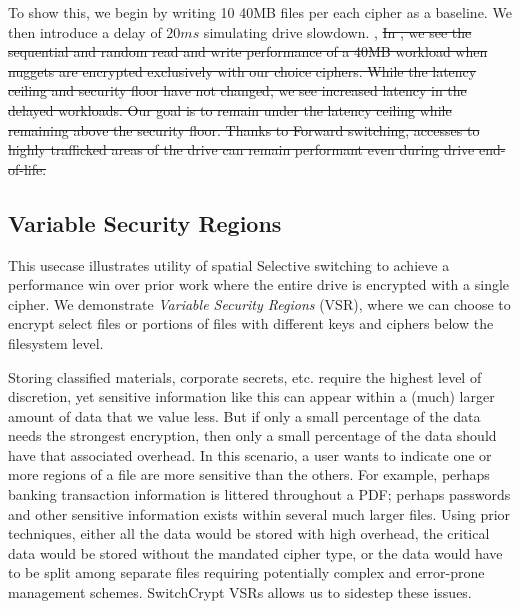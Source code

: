 

To show this, we begin by writing 10 40MB files per each cipher as a
baseline.  We then introduce a
delay of $20ms$ simulating drive slowdown.
,
\sout{
In , we see the sequential and random read and
write performance of a 40MB workload when nuggets are encrypted exclusively with
our choice ciphers. While the latency ceiling and security floor have not
changed, we see increased latency in the delayed workloads.
Our goal is to remain under the latency ceiling while remaining above the
security floor. Thanks to Forward switching, accesses to highly trafficked areas
of the drive can remain performant even during drive end-of-life.}



\subsection{Variable Security Regions} \label{subsec:uc2}


This usecase illustrates utility of spatial Selective switching to achieve a
performance win over prior work where the entire drive is encrypted with a
single cipher. We demonstrate \emph{Variable Security Regions} (VSR), where we
can choose to encrypt select files or portions of files with different keys and
ciphers below the filesystem level.

Storing classified materials, corporate secrets, etc. require the highest level
of discretion, yet sensitive information like this can appear within a (much)
larger amount of data that we value less. But if only a small percentage of the
data needs the strongest encryption, then only a small percentage of the data
should have that associated overhead. In this scenario, a user wants to indicate
one or more regions of a file are more sensitive than the others. For example,
perhaps banking transaction information is littered throughout a PDF; perhaps
passwords and other sensitive information exists within several much larger
files. Using prior techniques, either all the data would be stored with high
overhead, the critical data would be stored without the mandated cipher type, or
the data would have to be split among separate files requiring potentially
complex and error-prone management schemes. SwitchCrypt VSRs allows us to
sidestep these issues.

